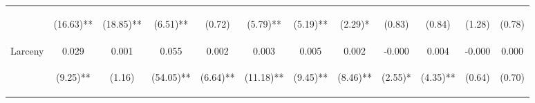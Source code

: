 \begin{tabular}{lccccccccccc}
 & \begin{footnotesize}(16.63)**\end{footnotesize} & \begin{footnotesize}(18.85)**\end{footnotesize} & \begin{footnotesize}(6.51)**\end{footnotesize} & \begin{footnotesize}(0.72)\end{footnotesize} & \begin{footnotesize}(5.79)**\end{footnotesize} & \begin{footnotesize}(5.19)**\end{footnotesize} & \begin{footnotesize}(2.29)*\end{footnotesize} & \begin{footnotesize}(0.83)\end{footnotesize} & \begin{footnotesize}(0.84)\end{footnotesize} & \begin{footnotesize}(1.28)\end{footnotesize} & \begin{footnotesize}(0.78)\end{footnotesize}\\
\noalign{\smallskip}Larceny & 0.029 & 0.001 & 0.055 & 0.002 & 0.003 & 0.005 & 0.002 & -0.000 & 0.004 & -0.000 & 0.000\\
 & \begin{footnotesize}(9.25)**\end{footnotesize} & \begin{footnotesize}(1.16)\end{footnotesize} & \begin{footnotesize}(54.05)**\end{footnotesize} & \begin{footnotesize}(6.64)**\end{footnotesize} & \begin{footnotesize}(11.18)**\end{footnotesize} & \begin{footnotesize}(9.45)**\end{footnotesize} & \begin{footnotesize}(8.46)**\end{footnotesize} & \begin{footnotesize}(2.55)*\end{footnotesize} & \begin{footnotesize}(4.35)**\end{footnotesize} & \begin{footnotesize}(0.64)\end{footnotesize} & \begin{footnotesize}(0.70)\end{footnotesize}\\

\end{tabular}

